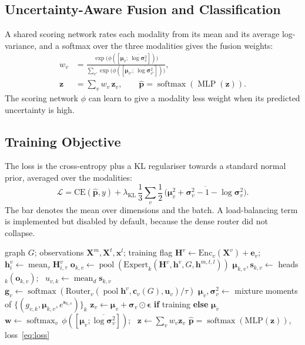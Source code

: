 \documentclass[journal]{IEEEtran}
\newcommand{\ugmoe}{UG-MoE}
\begin{document}
\subsection{Uncertainty-Aware Fusion and Classification}
\label{sec:fusion}
A shared scoring network rates each modality from its mean and its average log-variance, and a softmax over
the three modalities gives the fusion weights:
\begin{align}
  w_v &= \frac{\exp\big(\phi([\bm{\mu}_v;\ \overline{\log\bm{\sigma}^2_v}])\big)}{\sum_{v'}\exp\big(\phi([\bm{\mu}_{v'};\ \overline{\log\bm{\sigma}^2_{v'}}])\big)}, \\
  \bm{z} &= \textstyle\sum_v w_v\,\bm{z}_v ,\qquad \hat{\bm{p}}=\operatorname{softmax}(\operatorname{MLP}(\bm{z})).
\end{align}
The scoring network $\phi$ can learn to give a modality less weight when its predicted uncertainty is high.

\subsection{Training Objective}
The loss is the cross-entropy plus a KL regulariser towards a standard normal prior, averaged over the
modalities:
\begin{equation}
  \mathcal{L}=\mathrm{CE}(\hat{\bm{p}},y)+\lambda_{\mathrm{KL}}\,\frac{1}{3}\sum_v
  \frac{1}{2}\,\overline{\big(\bm{\mu}_v^2+\bm{\sigma}^2_v-1-\log\bm{\sigma}^2_v\big)} .
  \label{eq:loss}
\end{equation}
The bar denotes the mean over dimensions and the batch. A load-balancing term is implemented but disabled
by default, because the dense router did not collapse.

\begin{algorithm}[!t]
\caption{Forward pass of \ugmoe{} for one batch}
\label{alg:forward}
\begin{algorithmic}[1]
\Require graph $G$; observations $\bm{X}^m,\bm{X}^t,\bm{x}^l$; training flag
  \State $\bm{H}^v \gets \mathrm{Enc}_v(\bm{X}^v)+\bm{e}_v$; \ $\bm{h}^v_i\gets\operatorname{mean}_\tau \bm{H}^v_{i,\tau}$
    \State $\bm{o}_{k,v} \gets \operatorname{pool}(\mathrm{Expert}_k(\bm{H}^v,\bm{h}^v,G,\bm{h}^{m,t,l}))$
    \State $\bm{\mu}_{k,v}, \bm{s}_{k,v} \gets$ heads$_k(\bm{o}_{k,v})$; \ $u_{v,k}\gets\operatorname{mean}_d\bm{s}_{k,v}$
  \EndFor
  \State $\bm{g}_v \gets \operatorname{softmax}(\mathrm{Router}_v(\operatorname{pool}\bm{h}^v, \bm{c}_v(G), \bm{u}_v)/\tau)$
  \State $\bm{\mu}_v,\bm{\sigma}^2_v \gets$ mixture moments of $\{(g_{v,k},\bm{\mu}_{k,v},e^{\bm{s}_{k,v}})\}_k$
  \State $\bm{z}_v \gets \bm{\mu}_v+\bm{\sigma}_v\odot\bm{\epsilon}$ \textbf{if} training \textbf{else} $\bm{\mu}_v$
\EndFor
\State $\bm{w}\gets\operatorname{softmax}_v\,\phi([\bm{\mu}_v;\overline{\log\bm{\sigma}^2_v}])$; \ $\bm{z}\gets\sum_v w_v\bm{z}_v$
\State \Return $\hat{\bm{p}}=\operatorname{softmax}(\mathrm{MLP}(\bm{z}))$, loss~\eqref{eq:loss}
\end{algorithmic}
\end{algorithm}
\end{document}
